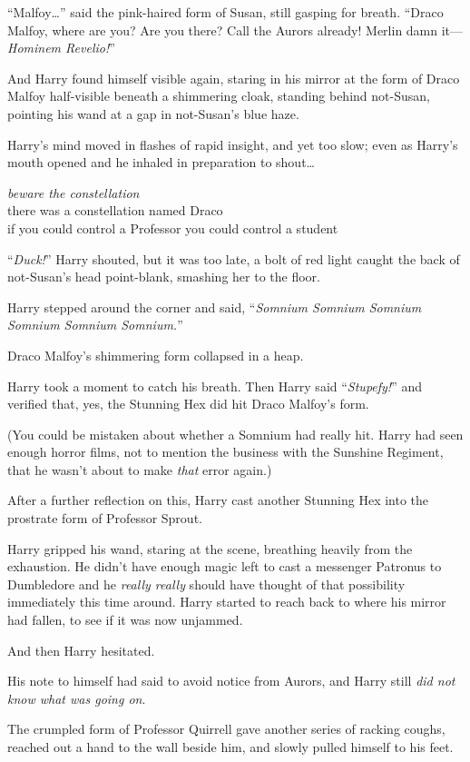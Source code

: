 “Malfoy…” said the pink-haired form of Susan, still gasping for breath.
“Draco Malfoy, where are you? Are you there? Call the Aurors already! Merlin damn it—\emph{Hominem Revelio!}”

And Harry found himself visible again, staring in his mirror at the form of Draco Malfoy half-visible beneath a shimmering cloak, standing behind not-Susan, pointing his wand at a gap in not-Susan’s blue haze.

Harry’s mind moved in flashes of rapid insight, and yet too slow; even as Harry’s mouth opened and he inhaled in preparation to shout…

\noindent{}\emph{beware the constellation}\\
there was a constellation named Draco\\
if you could control a Professor you could control a student

“\emph{Duck!}” Harry shouted, but it was too late, a bolt of red light caught the back of not-Susan’s head point-blank, smashing her to the floor.

Harry stepped around the corner and said, “\emph{Somnium Somnium Somnium Somnium Somnium Somnium.}”

Draco Malfoy’s shimmering form collapsed in a heap.

Harry took a moment to catch his breath. Then Harry said “\emph{Stupefy!}” and verified that, yes, the Stunning Hex did hit Draco Malfoy’s form.

(You could be mistaken about whether a Somnium had really hit. Harry had seen enough horror films, not to mention the business with the Sunshine Regiment, that he wasn’t about to make \emph{that} error again.)

After a further reflection on this, Harry cast another Stunning Hex into the prostrate form of Professor Sprout.

Harry gripped his wand, staring at the scene, breathing heavily from the exhaustion. He didn’t have enough magic left to cast a messenger Patronus to Dumbledore and he \emph{really really} should have thought of that possibility immediately this time around. Harry started to reach back to where his mirror had fallen, to see if it was now unjammed.

And then Harry hesitated.

His note to himself had said to avoid notice from Aurors, and Harry still \emph{did not know what was going on}.

The crumpled form of Professor Quirrell gave another series of racking coughs, reached out a hand to the wall beside him, and slowly pulled himself to his feet.

